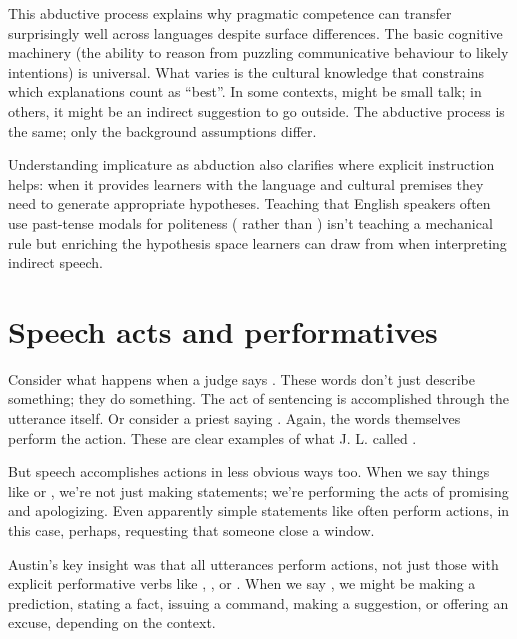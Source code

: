 This abductive process explains why pragmatic competence can transfer surprisingly well across languages despite surface differences. The basic cognitive machinery (the ability to reason from puzzling communicative behaviour to likely intentions) is universal. What varies is the cultural knowledge that constrains which explanations count as \enquote{best}. In some contexts,  might be small talk; in others, it might be an indirect suggestion to go outside. The abductive process is the same; only the background assumptions differ.

Understanding implicature as abduction also clarifies where explicit instruction helps: when it provides learners with the language and cultural premises they need to generate appropriate hypotheses. Teaching that English speakers often use past-tense modals for politeness ( rather than ) isn't teaching a mechanical rule but enriching the hypothesis space learners can draw from when interpreting indirect speech.

\section{Speech acts and performatives}\label{sec:speech-acts}

Consider what happens when a judge says . These words don't just describe something; they do something. The act of sentencing is accomplished through the utterance itself. Or consider a priest saying . Again, the words themselves perform the action. These are clear examples of what J. L. \citet{austin1962} called .

But speech accomplishes actions in less obvious ways too. When we say things like  or , we're not just making statements; we're performing the acts of promising and apologizing. Even apparently simple statements like  often perform actions, in this case, perhaps, requesting that someone close a window.

Austin's key insight was that all utterances perform actions, not just those with explicit performative verbs like , , or . When we say , we might be making a prediction, stating a fact, issuing a command, making a suggestion, or offering an excuse, depending on the context.


